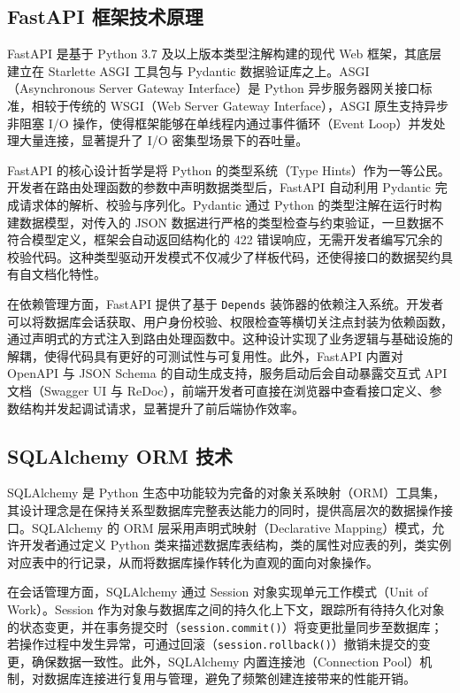 \subsection{FastAPI 框架技术原理}

FastAPI 是基于 Python 3.7 及以上版本类型注解构建的现代 Web 框架\super{[20]}，其底层建立在 Starlette ASGI 工具包与 Pydantic 数据验证库之上。ASGI（Asynchronous Server Gateway Interface）是 Python 异步服务器网关接口标准，相较于传统的 WSGI（Web Server Gateway Interface），ASGI 原生支持异步非阻塞 I/O 操作，使得框架能够在单线程内通过事件循环（Event Loop）并发处理大量连接，显著提升了 I/O 密集型场景下的吞吐量。

FastAPI 的核心设计哲学是将 Python 的类型系统（Type Hints）作为一等公民。开发者在路由处理函数的参数中声明数据类型后，FastAPI 自动利用 Pydantic 完成请求体的解析、校验与序列化。Pydantic 通过 Python 的类型注解在运行时构建数据模型，对传入的 JSON 数据进行严格的类型检查与约束验证，一旦数据不符合模型定义，框架会自动返回结构化的 422 错误响应，无需开发者编写冗余的校验代码。这种类型驱动开发模式不仅减少了样板代码，还使得接口的数据契约具有自文档化特性。

在依赖管理方面，FastAPI 提供了基于 \texttt{Depends} 装饰器的依赖注入系统。开发者可以将数据库会话获取、用户身份校验、权限检查等横切关注点封装为依赖函数，通过声明式的方式注入到路由处理函数中。这种设计实现了业务逻辑与基础设施的解耦，使得代码具有更好的可测试性与可复用性。此外，FastAPI 内置对 OpenAPI 与 JSON Schema 的自动生成支持，服务启动后会自动暴露交互式 API 文档（Swagger UI 与 ReDoc），前端开发者可直接在浏览器中查看接口定义、参数结构并发起调试请求，显著提升了前后端协作效率。

\subsection{SQLAlchemy ORM 技术}

SQLAlchemy 是 Python 生态中功能较为完备的对象关系映射（ORM）工具集，其设计理念是在保持关系型数据库完整表达能力的同时，提供高层次的数据操作接口。SQLAlchemy 的 ORM 层采用声明式映射（Declarative Mapping）模式，允许开发者通过定义 Python 类来描述数据库表结构，类的属性对应表的列，类实例对应表中的行记录，从而将数据库操作转化为直观的面向对象操作。

在会话管理方面，SQLAlchemy 通过 Session 对象实现单元工作模式（Unit of Work）。Session 作为对象与数据库之间的持久化上下文，跟踪所有待持久化对象的状态变更，并在事务提交时（\texttt{session.commit()}）将变更批量同步至数据库；若操作过程中发生异常，可通过回滚（\texttt{session.rollback()}）撤销未提交的变更，确保数据一致性。此外，SQLAlchemy 内置连接池（Connection Pool）机制，对数据库连接进行复用与管理，避免了频繁创建连接带来的性能开销。


